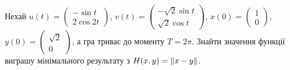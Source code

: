 \begin{example}
    Нехай $u(t) = \begin{pmatrix} -\sin t \\ 2 \cos {2t}\end{pmatrix}$, 
    $v(t) = \begin{pmatrix} -\sqrt{2}\sin t \\ \sqrt{2}\cos t \end{pmatrix}$,
    $x(0) = \begin{pmatrix} 1 \\ 0 \end{pmatrix}$, 
    $y(0) = \begin{pmatrix} \sqrt{2} \\ 0 \end{pmatrix}$, 
    а гра триває до моменту $T = 2\pi$.
    Знайти значення функції виграшу мінімального результату з $H(x, y) = \Vert x - y \Vert$.


\end{example}
